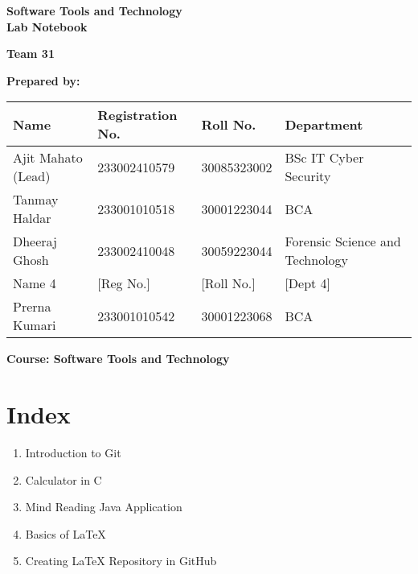 \begin{titlepage}
    \centering
    \vspace*{2cm}
    
    {\Huge\bfseries Software Tools and Technology \\[0.4cm] Lab Notebook \\[2cm]}
    
    {\Large\textbf{Team 31}\\[1.5cm]}
    
    \vspace{0.5cm}
    \textbf{Prepared by:}\\[0.5cm]
    
    \vspace{1cm}
    \begin{tabular}{|l|l|l|l|}
    \hline
    \textbf{Name} & \textbf{Registration No.} & \textbf{Roll No.} & \textbf{Department} \\
    \hline
     Ajit Mahato (Lead)& 233002410579& 30085323002& BSc IT Cyber Security\\
    Tanmay Haldar &233001010518 & 30001223044 & BCA \\
    Dheeraj Ghosh & 233002410048 & 30059223044 & Forensic Science and Technology \\
    Name 4 & [Reg No.] & [Roll No.] & [Dept 4] \\
    Prerna Kumari &233001010542 &30001223068 &BCA \\
    \hline
    \end{tabular}
    
    \vspace{2cm}
    
    \vfill
    \textbf{Course: Software Tools and Technology}
    
\end{titlepage}

\newpage
\chapter*{Index}
\thispagestyle{empty} %

\begin{enumerate}
    \item Introduction to Git
    \item Calculator in C\dotfill 
    \item Mind Reading Java Application\dotfill 
    \item Basics of LaTeX\dotfill 
    \item Creating LaTeX Repository in GitHub\dotfill 
\end{enumerate}
